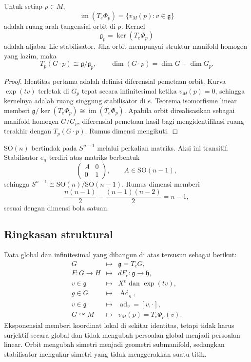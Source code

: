 \begin{Proposition}\label{o011-bl-prop-orbit-tangent}
Untuk setiap $p\in M$,
\[
  \operatorname{im}(T_e\Phi_p)
  =\{v_M(p):v\in\mathfrak g\}
\]
adalah ruang arah tangensial orbit di $p$. Kernel
\[
  \mathfrak g_p=\ker(T_e\Phi_p)
\]
adalah aljabar Lie stabilisator. Jika orbit mempunyai struktur manifold
homogen yang lazim, maka
\[
  T_p(G\cdot p)\cong\mathfrak g/\mathfrak g_p,
  \qquad
  \dim(G\cdot p)=\dim G-\dim G_p.
\]
\end{Proposition}

\begin{proof}
Identitas pertama adalah definisi diferensial pemetaan orbit. Kurva
$\exp(tv)$ terletak di $G_p$ tepat secara infinitesimal ketika
$v_M(p)=0$, sehingga kernelnya adalah ruang singgung stabilisator di $e$.
Teorema isomorfisme linear memberi
$\mathfrak g/\ker(T_e\Phi_p)\cong\operatorname{im}(T_e\Phi_p)$.
Apabila orbit direalisasikan sebagai manifold homogen $G/G_p$, diferensial
pemetaan hasil bagi mengidentifikasi ruang terakhir dengan $T_p(G\cdot p)$.
Rumus dimensi mengikuti.
\end{proof}

\begin{beispiel}\label{o011-bl-ex-sphere-action}
$\mathrm{SO}(n)$ bertindak pada $S^{n-1}$ melalui perkalian matriks. Aksi ini
transitif. Stabilisator $e_n$ terdiri atas matriks berbentuk
\[
  \begin{pmatrix} A&0\\0&1\end{pmatrix},
  \qquad A\in\mathrm{SO}(n-1),
\]
sehingga $S^{n-1}\cong\mathrm{SO}(n)/\mathrm{SO}(n-1)$. Rumus dimensi memberi
\[
 \frac{n(n-1)}2-\frac{(n-1)(n-2)}2=n-1,
\]
sesuai dengan dimensi bola satuan.
\end{beispiel}

\subsection{Ringkasan struktural}

Data global dan infinitesimal yang dibangun di atas tersusun sebagai berikut:
\[
\begin{array}{ccl}
G&\longmapsto&\mathfrak g=T_eG,\\
F\colon G\to H&\longmapsto&dF_e\colon\mathfrak g\to\mathfrak h,\\
v\in\mathfrak g&\longmapsto&X^v\text{ dan }\exp(tv),\\
g\in G&\longmapsto&\operatorname{Ad}_g,\\
v\in\mathfrak g&\longmapsto&\operatorname{ad}_v=[v,\cdot],\\
G\curvearrowright M&\longmapsto&v_M(p)=T_e\Phi_p(v).
\end{array}
\]
Eksponensial memberi koordinat lokal di sekitar identitas, tetapi tidak harus
surjektif secara global dan tidak mengubah persoalan global menjadi persoalan
linear. Orbit mengubah simetri menjadi geometri submanifold, sedangkan
stabilisator mengukur simetri yang tidak menggerakkan suatu titik.
